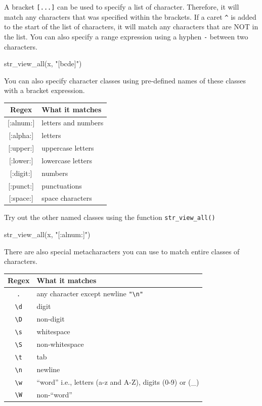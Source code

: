 \documentclass[
]{book}
\newenvironment{Shaded}{\begin{snugshade}}{\end{snugshade}}
\newcommand{\FunctionTok}[1]{\textcolor[rgb]{0.00,0.00,0.00}{#1}}
\newcommand{\NormalTok}[1]{#1}
\newcommand{\StringTok}[1]{\textcolor[rgb]{0.31,0.60,0.02}{#1}}
\begin{document}
A bracket \texttt{{[}...{]}} can be used to specify a list of character. Therefore, it will match any characters that was specified within the brackets. If a caret \texttt{\^{}} is added to the start of the list of characters, it will match any characters that are NOT in the list. You can also specify a range expression using a hyphen \texttt{-} between two characters.

\begin{Shaded}
\begin{Highlighting}[]
\FunctionTok{str\_view\_all}\NormalTok{(x, }\StringTok{"[bcde]"}\NormalTok{)}
\end{Highlighting}
\end{Shaded}

You can also specify character classes using pre-defined names of these classes with a bracket expression.

\begin{longtable}[]{@{}cl@{}}
\toprule
Regex & What it matches \\
\midrule
\endhead
{[}:alnum:{]} & letters and numbers \\
{[}:alpha:{]} & letters \\
{[}:upper:{]} & uppercase letters \\
{[}:lower:{]} & lowercase letters \\
{[}:digit:{]} & numbers \\
{[}:punct:{]} & punctuations \\
{[}:space:{]} & space characters \\
\bottomrule
\end{longtable}

Try out the other named classes using the function \texttt{str\_view\_all()}

\begin{Shaded}
\begin{Highlighting}[]
\FunctionTok{str\_view\_all}\NormalTok{(x, }\StringTok{"[:alnum:]"}\NormalTok{)}
\end{Highlighting}
\end{Shaded}

There are also special metacharacters you can use to match entire classes of characters.

\begin{longtable}[]{@{}cl@{}}
\toprule
Regex & What it matches \\
\midrule
\endhead
\texttt{.} & any character except newline \texttt{"\textbackslash{}n"} \\
\texttt{\textbackslash{}d} & digit \\
\texttt{\textbackslash{}D} & non-digit \\
\texttt{\textbackslash{}s} & whitespace \\
\texttt{\textbackslash{}S} & non-whitespace \\
\texttt{\textbackslash{}t} & tab \\
\texttt{\textbackslash{}n} & newline \\
\texttt{\textbackslash{}w} & ``word'' i.e., letters (a-z and A-Z), digits (0-9) or (\_) \\
\texttt{\textbackslash{}W} & non-``word'' \\
\bottomrule
\end{longtable}
\end{document}
